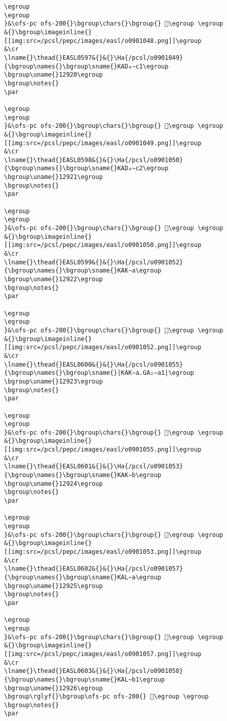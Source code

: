 \begin{verbatim}
\egroup
\egroup
}&\ofs-pc ofs-200{}\bgroup\chars{}\bgroup{} 𒤟\egroup \egroup
&{}\bgroup\imageinline{}[[img:src=/pcsl/pepc/images/easl/o0901048.png]]\egroup
&\cr
\lname{}\thead{}EASL0597&{}&{}\Ha{/pcsl/o0901049}{\bgroup\names{}\bgroup\sname{}KAD₄∼c1\egroup
\bgroup\uname{}12920\egroup
\bgroup\notes{}
\par 

\egroup
\egroup
}&\ofs-pc ofs-200{}\bgroup\chars{}\bgroup{} 𒤠\egroup \egroup
&{}\bgroup\imageinline{}[[img:src=/pcsl/pepc/images/easl/o0901049.png]]\egroup
&\cr
\lname{}\thead{}EASL0598&{}&{}\Ha{/pcsl/o0901050}{\bgroup\names{}\bgroup\sname{}KAD₄∼c2\egroup
\bgroup\uname{}12921\egroup
\bgroup\notes{}
\par 

\egroup
\egroup
}&\ofs-pc ofs-200{}\bgroup\chars{}\bgroup{} 𒤡\egroup \egroup
&{}\bgroup\imageinline{}[[img:src=/pcsl/pepc/images/easl/o0901050.png]]\egroup
&\cr
\lname{}\thead{}EASL0599&{}&{}\Ha{/pcsl/o0901052}{\bgroup\names{}\bgroup\sname{}KAK∼a\egroup
\bgroup\uname{}12922\egroup
\bgroup\notes{}
\par 

\egroup
\egroup
}&\ofs-pc ofs-200{}\bgroup\chars{}\bgroup{} 𒤢\egroup \egroup
&{}\bgroup\imageinline{}[[img:src=/pcsl/pepc/images/easl/o0901052.png]]\egroup
&\cr
\lname{}\thead{}EASL0600&{}&{}\Ha{/pcsl/o0901055}{\bgroup\names{}\bgroup\sname{}|KAK∼a.GA₂∼a1|\egroup
\bgroup\uname{}12923\egroup
\bgroup\notes{}
\par 

\egroup
\egroup
}&\ofs-pc ofs-200{}\bgroup\chars{}\bgroup{} 𒤣\egroup \egroup
&{}\bgroup\imageinline{}[[img:src=/pcsl/pepc/images/easl/o0901055.png]]\egroup
&\cr
\lname{}\thead{}EASL0601&{}&{}\Ha{/pcsl/o0901053}{\bgroup\names{}\bgroup\sname{}KAK∼b\egroup
\bgroup\uname{}12924\egroup
\bgroup\notes{}
\par 

\egroup
\egroup
}&\ofs-pc ofs-200{}\bgroup\chars{}\bgroup{} 𒤤\egroup \egroup
&{}\bgroup\imageinline{}[[img:src=/pcsl/pepc/images/easl/o0901053.png]]\egroup
&\cr
\lname{}\thead{}EASL0602&{}&{}\Ha{/pcsl/o0901057}{\bgroup\names{}\bgroup\sname{}KAL∼a\egroup
\bgroup\uname{}12925\egroup
\bgroup\notes{}
\par 

\egroup
\egroup
}&\ofs-pc ofs-200{}\bgroup\chars{}\bgroup{} 𒤥\egroup \egroup
&{}\bgroup\imageinline{}[[img:src=/pcsl/pepc/images/easl/o0901057.png]]\egroup
&\cr
\lname{}\thead{}EASL0603&{}&{}\Ha{/pcsl/o0901058}{\bgroup\names{}\bgroup\sname{}KAL∼b1\egroup
\bgroup\uname{}12926\egroup
\bgroup\rglyf{}\bgroup\ofs-pc ofs-200{} 𒤦\egroup \egroup
\bgroup\notes{}
\par 


\end{verbatim}
